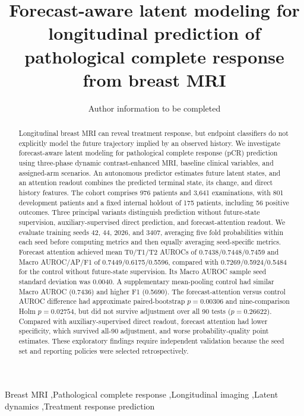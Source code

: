 \documentclass[5p,twocolumn,authoryear]{elsarticle}
\begin{document}
\begin{frontmatter}
\title{Forecast-aware latent modeling for longitudinal prediction of pathological complete response from breast MRI}
\author{Author information to be completed}
\address{Affiliations and corresponding author to be completed}
\begin{abstract}
Longitudinal breast MRI can reveal treatment response, but endpoint classifiers do not explicitly model the future trajectory implied by an observed history. We investigate forecast-aware latent modeling for pathological complete response (pCR) prediction using three-phase dynamic contrast-enhanced MRI, baseline clinical variables, and assigned-arm scenarios. An autonomous predictor estimates future latent states, and an attention readout combines the predicted terminal state, its change, and direct history features. The cohort comprises 976 patients and 3,641 examinations, with 801 development patients and a fixed internal holdout of 175 patients, including 56 positive outcomes. Three principal variants distinguish prediction without future-state supervision, auxiliary-supervised direct prediction, and forecast-attention readout. We evaluate training seeds 42, 44, 2026, and 3407, averaging five fold probabilities within each seed before computing metrics and then equally averaging seed-specific metrics. Forecast attention achieved mean T0/T1/T2 AUROCs of 0.7438/0.7448/0.7459 and Macro AUROC/AP/F1 of 0.7449/0.6175/0.5596, compared with 0.7269/0.5924/0.5484 for the control without future-state supervision. Its Macro AUROC sample seed standard deviation was 0.0040. A supplementary mean-pooling control had similar Macro AUROC (0.7436) and higher F1 (0.5690). The forecast-attention versus control AUROC difference had approximate paired-bootstrap $p=0.00306$ and nine-comparison Holm $p=0.02754$, but did not survive adjustment over all 90 tests ($p=0.26622$). Compared with auxiliary-supervised direct readout, forecast attention had lower specificity, which survived all-90 adjustment, and worse probability-quality point estimates. These exploratory findings require independent validation because the seed set and reporting policies were selected retrospectively.
\end{abstract}
\begin{keyword}
Breast MRI \sep Pathological complete response \sep Longitudinal imaging \sep Latent dynamics \sep Treatment response prediction
\end{keyword}
\end{frontmatter}








\end{document}
